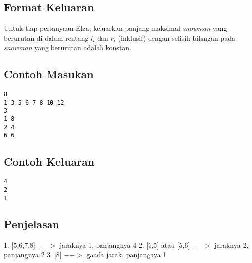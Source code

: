 \documentclass{article}
\begin{document}
\subsection*{Format Keluaran}
Untuk tiap pertanyaan Elza, keluarkan panjang maksimal \textit{snowman} yang berurutan di dalam rentang $l_i$ dan $r_i$ (inklusif) 
dengan selisih bilangan pada \textit{snowman} yang berurutan adalah konstan.
\\

\begin{multicols}{2}
\subsection*{Contoh Masukan}
\begin{lstlisting}
8
1 3 5 6 7 8 10 12
3
1 8
2 4
6 6
\end{lstlisting}
\columnbreak
\subsection*{Contoh Keluaran}
\begin{lstlisting}
4
2
1
\end{lstlisting}
\vfill
\null
\end{multicols}

\subsection*{Penjelasan}
1. [5,6,7,8] $-->$ jaraknya 1, panjangnya 4
2. [3,5] atau [5,6] $-->$ jaraknya 2, panjangnya 2
3. [8] $-->$ gaada jarak, panjangnya 1


\pagebreak
\end{document}
